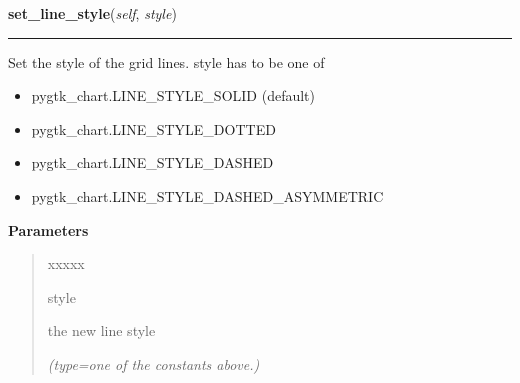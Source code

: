 \hspace{.8\funcindent}\begin{boxedminipage}{\funcwidth}

    \raggedright \textbf{set\_line\_style}(\textit{self}, \textit{style})

    \vspace{-1.5ex}

    \rule{\textwidth}{0.5\fboxrule}
\setlength{\parskip}{2ex}
    Set the style of the grid lines. style has to be one of

    \begin{itemize}
    \setlength{\parskip}{0.6ex}
      \item pygtk\_chart.LINE\_STYLE\_SOLID (default)

      \item pygtk\_chart.LINE\_STYLE\_DOTTED

      \item pygtk\_chart.LINE\_STYLE\_DASHED

      \item pygtk\_chart.LINE\_STYLE\_DASHED\_ASYMMETRIC

    \end{itemize}

\setlength{\parskip}{1ex}
      \textbf{Parameters}
      \vspace{-1ex}

      \begin{quote}
        \begin{Ventry}{xxxxx}

          \item[style]

          the new line style

            {\it (type=one of the constants above.)}

        \end{Ventry}

      \end{quote}

    \end{boxedminipage}

    \label{pygtk_chart:bar_chart:Grid:get_line_style}

    \vspace{0.5ex}

